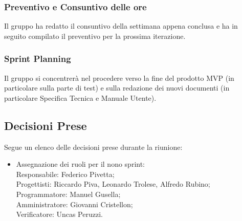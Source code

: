 \documentclass[10pt]{article}
\begin{document}
\subsubsection{Preventivo e Consuntivo delle ore}
Il gruppo ha redatto il consuntivo della settimana appena conclusa e ha in seguito compilato il preventivo per la prossima iterazione.

\subsubsection{Sprint Planning}
Il gruppo si concentrerà nel procedere verso la fine del prodotto MVP (in particolare sulla parte di test) e sulla redazione dei nuovi documenti (in particolare Specifica Tecnica e Manuale Utente).

\subsection{Decisioni Prese}
Segue un elenco delle decisioni prese durante la riunione:
\begin{itemize}
    \item   Assegnazione dei ruoli per il nono sprint:\\
            Responsabile: Federico Pivetta;\\
            Progettisti: Riccardo Piva, Leonardo Trolese, Alfredo Rubino;\\
            Programmatore: Manuel Gusella;\\
            Amministratore: Giovanni Cristellon;\\
            Verificatore: Uncas Peruzzi.
\end{itemize}
\end{document}
